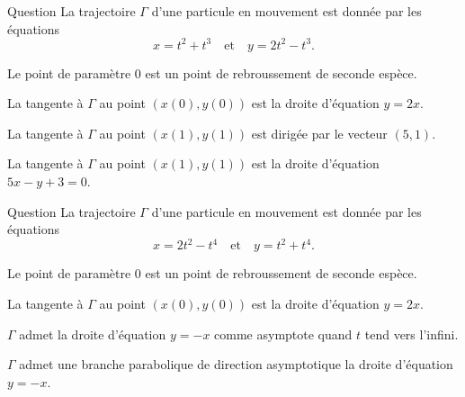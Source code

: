 \begin{multi}[multiple,feedback=
{Le \(DL_3(0)\) de \(f(t)=(x(t),y(t))\) est 
\[f(t)=t^2(1,2)+t^3(1,-1)+t^3\left(\varepsilon_1(t),\varepsilon_2(t)\right)\mbox{ avec }\lim _{t\to 0}\varepsilon_i(t)=0.\]
Donc le point de paramètre \(0\) est un point de rebroussement de première espèce et la tangente en ce point est la droite d'équation \(y=2x\). La tangente à \(\Gamma\) au point de paramètre \(1\) est dirigée par \(f'(1)=(5,1)\).
}]{Question}
La trajectoire \(\Gamma\) d'une particule en mouvement est donnée par les équations
\[x=t^2+t^3\quad \mbox{et} \quad  y=2t^2-t^3.\]

    \item Le point de paramètre \(0\) est un point de rebroussement de seconde espèce.
    \item* La tangente à \(\Gamma\) au point \((x(0),y(0))\) est la droite d'équation \(y=2x\).
    \item* La tangente à \(\Gamma\) au point \((x(1),y(1))\) est dirigée par le vecteur \((5,1)\).
    \item La tangente à \(\Gamma\) au point \((x(1),y(1))\) est la droite d'équation \(5x-y+3=0\).
\end{multi}


\begin{multi}[multiple,feedback=
{Le \(DL_4(0)\) de \(f(t)=(x(t),y(t))\) est 
\[f(t)=t^2(2,1)+t^4(-1,1)+t^4\left(\varepsilon_1(t),\varepsilon_2(t)\right)\mbox{ avec }\lim _{t\to 0}\varepsilon_i(t)=0.\]
Donc le point de paramètre \(0\) est un point de rebroussement de seconde espèce et la tangente en ce point est la droite d'équation \(2y-x=0\). Enfin \(\displaystyle \lim _{t\to \pm \infty}[y(t)+x(t)]=+\infty\), donc \(\Gamma\) admet une branche parabolique de direction asymptotique la droite d'équation \(y=-x\).
}]{Question}
La trajectoire \(\Gamma\) d'une particule en mouvement est donnée par les équations
\[x=2t^2-t^4\quad \mbox{et} \quad  y=t^2+t^4.\]

    \item* Le point de paramètre \(0\) est un point de rebroussement de seconde espèce.
    \item La tangente à \(\Gamma\) au point \((x(0),y(0))\) est la droite d'équation \(y=2x\).
    \item \(\Gamma\) admet la droite d'équation \(y=-x\) comme asymptote quand \(t\) tend vers l'infini.
    \item* \(\Gamma\) admet une branche parabolique de direction asymptotique la droite d'équation \(y=-x\).
\end{multi}


